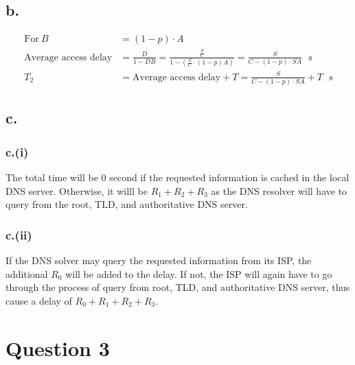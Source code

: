 \documentclass[12pt]{article}
\begin{document}
\subsection{b.}

\begin{align*}
    \text{For} \ B &= (1-p) \cdot A \\
    \text{Average access delay} &= \frac{D}{1-DB} = \frac{\frac{S}{C}}{1-(\frac{S}{C} \cdot (1-p) A)} = \frac{S}{C-(1-p) \cdot SA}\ \ \ \text{s} \\
    T_2 &= \text{Average access delay} + T = \frac{S}{C-(1-p) \cdot SA} + T \ \ \ \text{s}
\end{align*}

\subsection{c.}
\subsubsection{c.(i)}
The total time will be $0$ second if the requested information is cached in the local DNS server. Otherwise, it willl be $R_1 + R_2 + R_3$ as the DNS resolver will have to query from the root, TLD, and authoritative DNS server.


\subsubsection{c.(ii)}
If the DNS solver may query the requested information from its ISP, the additional $R_0$ will be added to the delay. If not, the ISP will again have to go through the process of query from root, TLD, and authoritative DNS server, thus cause a delay of $R_0 + R_1 + R_2 + R_3$.

\section{Question 3}
\end{document}
